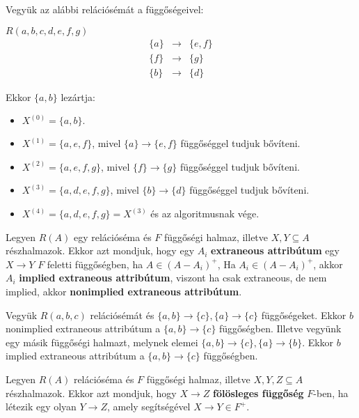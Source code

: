 \begin{pld}
Vegyük az alábbi relációsémát a függőségeivel:
\begin{center}
    $R(a,b,c,d,e,f,g)$ \break
    $$
    \begin{matrix}
    \{a\} & \longrightarrow & \{e,f\} \\
    \{f\} & \longrightarrow & \{g\} \\
    \{b\} & \longrightarrow & \{d\}
    \end{matrix}
    $$
    
\end{center}
Ekkor $\{a,b\}$ lezártja:
\begin{itemize}
    \item $X^{(0)} = \{a,b\}.$
    \item $X^{(1)} = \{a,e,f\}$, mivel $\{a\} \longrightarrow \{e,f\}$ függőséggel tudjuk bővíteni.
    \item $X^{(2)} = \{a,e,f,g\}$, mivel $\{f\} \longrightarrow \{g\}$ függőséggel tudjuk bővíteni.
    \item $X^{(3)} = \{a,d,e,f,g\}$, mivel $\{b\} \longrightarrow \{d\}$ függőséggel tudjuk bővíteni.
    \item $X^{(4)} = \{a,d,e,f,g\} = X^{(3)}$ és az algoritmusnak vége.
\end{itemize}
\end{pld}

\begin{defi}
Legyen $R(A)$ egy relációséma és $F$ függőségi halmaz, illetve $X,Y \subseteq A$ részhalmazok. Ekkor azt mondjuk, hogy egy $A_i$ \textbf{extraneous attribútum} egy $X \longrightarrow Y$ $F$ feletti függőségben, ha $A \in (A-A_i)^+$, Ha $A_i \in (A-A_i)^+$, akkor $A_i$ \textbf{implied extraneous attribútum}, viszont ha csak extraneous, de nem implied, akkor \textbf{nonimplied extraneous attribútum}.
\end{defi}

\begin{pld}
Vegyük $R(a,b,c)$ relációsémát és $\{a,b\} \longrightarrow \{c\}, \{a\} \longrightarrow \{c\}$ függőségeket. Ekkor $b$ nonimplied extraneous attribútum a $\{a,b\} \longrightarrow \{c\}$ függőségben. \hfill \break
Illetve vegyünk egy másik függőségi halmazt, melynek elemei $\{a,b\} \longrightarrow \{c\}, \{a\} \longrightarrow \{b\}$. Ekkor $b$ implied extraneous attribútum a $\{a,b\} \longrightarrow \{c\}$ függőségben.
\end{pld}

\begin{defi}
Legyen $R(A)$ relációséma és $F$ függőségi halmaz, illetve $X,Y,Z \subseteq A$ részhalmazok. Ekkor azt mondjuk, hogy $X \longrightarrow Z$ \textbf{fölösleges függőség} $F$-ben, ha létezik egy olyan $Y \longrightarrow Z$, amely segítségével $X \longrightarrow Y \in F^+$.
\end{defi}


